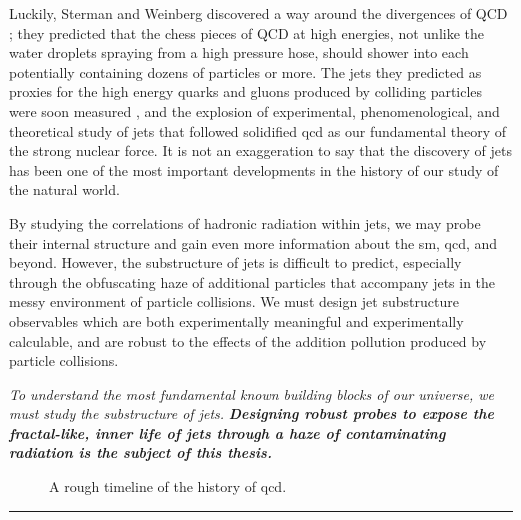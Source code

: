 Luckily, Sterman and Weinberg discovered a way around the divergences of QCD \cite{Sterman:1977wj};
%
they predicted that the chess pieces of QCD at high energies, not unlike the water droplets spraying from a high pressure hose, should shower into  each potentially containing dozens of particles or more.
%
The jets they predicted as proxies for the high energy quarks and gluons produced by colliding particles were soon measured \cite{Hanson:1975fe,Wiik:1979cq,Barber:1979yr,TASSO:1979zyf,PLUTO:1979dxn,JADE:1979rke,Ali:1979em,Hanson:1981em,Ali:2010tw}, and the explosion of experimental, phenomenological, and theoretical study of jets that followed solidified \gls{qcd} as our fundamental theory of the strong nuclear force.
%
It is not an exaggeration to say that the discovery of jets has been one of the most important developments in the history of our study of the natural world.

By studying the correlations of hadronic radiation within jets, we may probe their internal structure and gain even more information about the \gls{sm}, \gls{qcd}, and beyond.
%
However, the substructure of jets is difficult to predict, especially through the obfuscating haze of additional particles that accompany jets in the messy environment of particle collisions.
%
We must design jet substructure observables which are both experimentally meaningful and experimentally calculable, and are robust to the effects of the addition pollution produced by particle collisions.

\textit{To understand the most fundamental known building blocks of our universe, we must study the substructure of jets.}
%
\textbf{\textit{Designing robust probes to expose the fractal-like, inner life of jets through a haze of contaminating radiation is the subject of this thesis.}}



\begin{figure}[]
    {
        \hspace{-1.7cm}
        
    }
    \caption[A rough timeline of the history of \gls{qcd}. ]
    {
        A rough timeline of the history of \gls{qcd}.
    }
    \label{fig:qcd-timeline}
\end{figure}


\vspace{1.0cm}
\hrule
\vspace{1.0cm}


